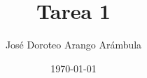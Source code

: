 \documentclass[10pt,oneside]{article}
\author{José Doroteo Arango Arámbula} %
\title{Tarea 1}
\date{\today}
\begin{document}
\maketitle
\thispagestyle{fancy} %

\nocite{Ross2012}
\printbibliography
\end{document}
